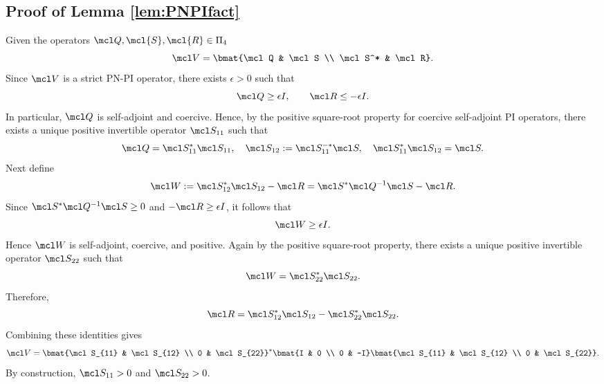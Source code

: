 \subsection{Proof of Lemma \ref{lem:PNPIfact}}\label{proof:PNPIfact}
Given the operators $\mcl Q, \mcl{S}, \mcl{R} \in \Pi_4$
\begin{equation*}
	\mcl V=\bmat{\mcl Q & \mcl S \\ \mcl S^* & \mcl R}.
\end{equation*}
Since $\mcl V$ is a strict PN-PI operator, there exists $\epsilon>0$ such that
\begin{equation*}
	\mcl Q \ge \epsilon I, \qquad \mcl R\le -\epsilon I.
\end{equation*}
In particular, $\mcl Q$ is self-adjoint and coercive. Hence, by the positive
square-root property for coercive self-adjoint PI operators, there
exists a unique positive invertible operator $\mcl S_{11}$ such that
\begin{equation*}
	{\mcl Q=\mcl S_{11}^*\mcl S_{11}}, \quad
	\mcl S_{12}:=\mcl S_{11}^{-*}\mcl S, \quad
	\mcl S_{11}^*\mcl S_{12}=\mcl S.
\end{equation*}
Next define
\begin{equation*}
	\mcl W:=\mcl S_{12}^*\mcl S_{12}-\mcl R=\mcl S^*\mcl Q^{-1}\mcl S-\mcl R.
\end{equation*}
Since $\mcl S^*\mcl Q^{-1}\mcl S\ge 0$ and $-\mcl R\ge \epsilon I$, it follows that
\begin{equation*}
	\mcl W\ge \epsilon I.
\end{equation*}
Hence $\mcl W$ is self-adjoint, coercive, and positive. Again by the positive
square-root property, there exists a unique positive invertible operator
$\mcl S_{22}$ such that
\begin{equation*}
	\mcl W=\mcl S_{22}^*\mcl S_{22}.
\end{equation*}
Therefore,
\begin{equation*}
	\mcl R=\mcl S_{12}^*\mcl S_{12}-\mcl S_{22}^*\mcl S_{22}.
\end{equation*}
Combining these identities gives
\begin{equation*}
	\mcl V=\bmat{\mcl S_{11} & \mcl S_{12} \\ 0 & \mcl S_{22}}^*\bmat{I & 0 \\ 0 & -I}\bmat{\mcl S_{11} & \mcl S_{12} \\ 0 & \mcl S_{22}}.
\end{equation*}
By construction, $\mcl S_{11}>0$ and $\mcl S_{22}>0$.


